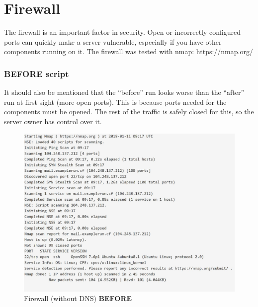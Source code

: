 \section{Firewall}
The firewall is an important factor in security. Open or incorrectly configured ports can quickly make a server vulnerable, especially if you have other components running on it.
The firewall was tested with nmap: https://nmap.org/


\subsubsection{BEFORE script}
It should also be mentioned that the ``before'' run looks worse than the ``after'' run at first sight (more open ports). 
This is because ports needed for the components must be opened. The rest of the traffic is safely closed for this, so the server owner has control over it.

\begin{figure}[H]
	\centering
	\includegraphics[width=\linewidth]{pics/fw_before_no_dns}
    \caption{Firewall (without DNS) \textbf{BEFORE}}
	\label{fig:firewallnodnsbefore}
\end{figure}

